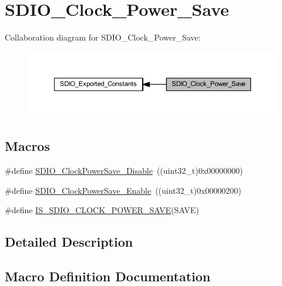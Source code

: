\hypertarget{group___s_d_i_o___clock___power___save}{}\section{S\+D\+I\+O\+\_\+\+Clock\+\_\+\+Power\+\_\+\+Save}
\label{group___s_d_i_o___clock___power___save}
Collaboration diagram for S\+D\+I\+O\+\_\+\+Clock\+\_\+\+Power\+\_\+\+Save\+:
\nopagebreak
\begin{figure}[H]
\begin{center}
\leavevmode
\includegraphics[width=350pt]{group___s_d_i_o___clock___power___save}
\end{center}
\end{figure}
\subsection*{Macros}
\begin{DoxyCompactItemize}
\item 
\#define \hyperlink{group___s_d_i_o___clock___power___save_ga032aa5fb2dfd7ba5dbd60a3845c82ba0}{S\+D\+I\+O\+\_\+\+Clock\+Power\+Save\+\_\+\+Disable}~((uint32\+\_\+t)0x00000000)
\item 
\#define \hyperlink{group___s_d_i_o___clock___power___save_ga9f5b66a0044c4ff36a3eb1ec758f7ea7}{S\+D\+I\+O\+\_\+\+Clock\+Power\+Save\+\_\+\+Enable}~((uint32\+\_\+t)0x00000200)
\item 
\#define \hyperlink{group___s_d_i_o___clock___power___save_ga41988203e5d4e35a755aa604f1876cd3}{I\+S\+\_\+\+S\+D\+I\+O\+\_\+\+C\+L\+O\+C\+K\+\_\+\+P\+O\+W\+E\+R\+\_\+\+S\+A\+VE}(S\+A\+VE)
\end{DoxyCompactItemize}


\subsection{Detailed Description}


\subsection{Macro Definition Documentation}
\mbox{\label{group___s_d_i_o___clock___power___save_ga41988203e5d4e35a755aa604f1876cd3}} 
